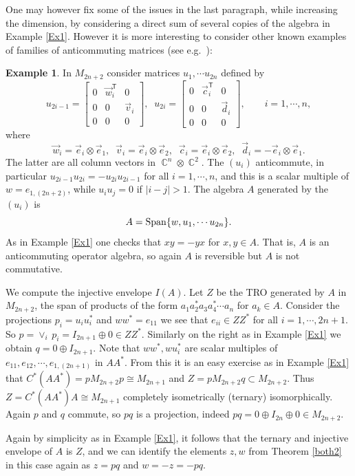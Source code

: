 \documentclass{amsart}
\theoremstyle{remark}
\theoremstyle{definition}
\newtheorem{example}[theorem]{Example}
\numberwithin{equation}{section}
\DeclareMathOperator{\bC}{{\mathbb C}}
\newcommand*{\tran}{\mathsf{T}}
\begin{document}
One may however fix some of the issues in the last paragraph, while increasing the dimension,  by considering a 
direct sum of several copies of the algebra in Example \ref{Ex1}.  However it is more interesting to consider other known examples of families of anticommuting matrices (see e.g.\ \cite{H}): 


\begin{example} In $M_{2n+2}$ consider matrices  $u_1, \cdots u_{2n}$ defined by
$$u_{2i-1} = \begin{bmatrix} 0 & \vec w_i^\tran & 0 \\
 0 &   0 & \vec v_i  \\ 0 &    0 &   0  \end{bmatrix} , \; \; 
 u_{2i} = \begin{bmatrix} 0 & \vec c_i^\tran & 0 \\
 0 &   0 & \vec d_i  \\ 0 &    0 &   0  \end{bmatrix} , \qquad i = 1, \cdots , n ,$$ 
 where $$\vec w_i = \vec e_i \otimes \vec e_1 , \; \; \vec v_i = \vec e_i \otimes \vec e_2 , \; \;  \vec c_i = \vec e_i \otimes \vec e_2 , \; \; 
 \vec d_i = - \vec e_i \otimes \vec e_1 .$$  The latter are all column vectors in $\bC^n \otimes \bC^2$.  The $(u_i)$ anticommute, in particular 
 $u_{2i-1} u_{2 i} = - u_{2 i} u_{2i-1}$ for all $i = 1, \cdots , n$, and this is a scalar multiple of $w = e_{1,(2n+2)}$, while  $u_i u_j = 0$ if 
 $|i-j| > 1$.  
 The algebra $A$ generated by the $(u_i)$ is $$A = {\rm Span} \{ w , u_1, \cdots u_{2n} \}.$$ 
 As in Example \ref{Ex1} one checks that $xy = -yx$ for $x, y \in A$.  That is, $A$ is an anticommuting operator algebra, so again
  $A$ is reversible but $A$ is not commutative.

We compute the injective envelope $I(A)$.   Let $Z$ be the TRO generated by $A$ in $M_{2n+2}$, the span of 
products of the form $a_1 a_2^* a_3 a_4^* \cdots a_n$ for $a_k \in A.$ 
Consider the projections $p_i = u_i u_i^*$ and $w w^* = e_{11}$ we see that $e_{ii} \in Z Z^*$ for all $i = 1, \cdots, 2n+1$. 
So $p = \vee_i \, p_i   = I_{2n+1} \oplus 0 \in Z Z^*$.     Similarly on the right as in Example \ref{Ex1} we obtain
$q = 0 \oplus I_{2n+1}$. 
Note that $ww^*, w u_i^*$ are scalar multiples of $e_{11}, e_{12}, \cdots , e_{1, (2n+1)}$ in $A A^*$.   From this 
it is an easy exercise as in Example \ref{Ex1}  that $C^*(A A^*) = p M_{2n+2} p \cong M_{2n+1}$ and $Z = p M_{2n+2} q \subset M_{2n+2}$. 
 Thus $Z = C^*(A A^*)  A \cong M_{2n+1}$ completely isometrically
(ternary) isomorphically.   Again $p$ and $q$ commute, so $pq$ is a projection, indeed $pq = 0 \oplus I_{2n} \oplus 0 \in M_{2n+2}$. 
 
 Again by simplicity as in Example \ref{Ex1}, it follows that the ternary and injective envelope of $A$ is $Z$, and 
 we can identify the elements $z,w$ from Theorem \ref{both2} in this case again as
 $z  = pq$ and $w = -z = -pq$.    \end{example}
 
\end{document}
